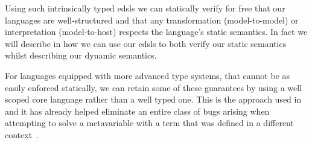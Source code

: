 \noindent
Using such intrinsically typed \acp{edsl} we can statically verify for free
that our languages are well-structured and that any transformation (model-to-model)
or interpretation (model-to-host) respects the language's static semantics.
%
In fact we will describe in  how we can use our \acp{edsl}
to both verify our static semantics whilst describing our dynamic semantics.

For languages equipped with more advanced type systems, that cannot be as easily
enforced statically, we can retain some of these guarantees by using a well
scoped core language rather than a well typed one.
%
This is the approach used in \Idris{} and it has already helped eliminate an
entire class of bugs arising when attempting to solve a metavariable with a
term that was defined in a different context~\cite{DBLP:conf/ecoop/Brady21}.
